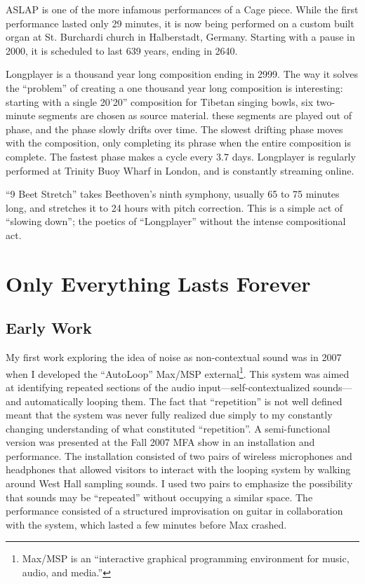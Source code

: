 \documentclass{thesis}
\begin{document}
ASLAP is one of the more infamous performances of a Cage piece. While the first performance lasted only 29 minutes, it is now being performed on a custom built organ at St. Burchardi church in Halberstadt, Germany. Starting with a pause in 2000, it is scheduled to last 639 years, ending in 2640.
	
Longplayer is a thousand year long composition ending in 2999. The way it solves the ``problem'' of creating a one thousand year long composition is interesting: starting with a single 20'20'' composition for Tibetan singing bowls, six two-minute segments are chosen as source material. these segments are played out of phase, and the phase slowly drifts over time. The slowest drifting phase moves with the composition, only completing its phrase when the entire composition is complete. The fastest phase makes a cycle every 3.7 days. Longplayer is regularly performed at Trinity Buoy Wharf in London, and is constantly streaming online.

``9 Beet Stretch'' takes Beethoven's ninth symphony, usually 65 to 75 minutes long, and stretches it to 24 hours with pitch correction. This is a simple act of ``slowing down''; the poetics of ``Longplayer'' without the intense compositional act.
				
\chapter{Only Everything Lasts Forever}

\section{Early Work}

My first work exploring the idea of noise as non-contextual sound was in 2007 when I developed the ``AutoLoop'' Max/MSP external\footnote{Max/MSP is an ``interactive graphical programming environment for music, audio, and media.''\cite{_products_2010}}. This system was aimed at identifying repeated sections of the audio input---self-contextualized sounds---and automatically looping them. The fact that ``repetition'' is not well defined meant that the system was never fully realized due simply to my constantly changing understanding of what constituted ``repetition''. A semi-functional version was presented at the Fall 2007 MFA show in an installation and performance. The installation consisted of two pairs of wireless microphones and headphones that allowed visitors to interact with the looping system by walking around West Hall sampling sounds. I used two pairs to emphasize the possibility that sounds may be ``repeated'' without occupying a similar space. The performance consisted of a structured improvisation on guitar in collaboration with the system, which lasted a few minutes before Max crashed.
\end{document}
